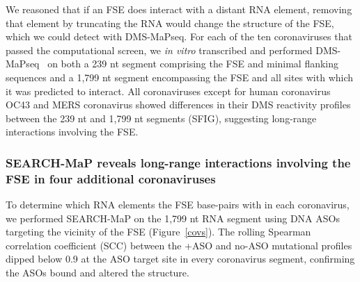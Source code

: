 \documentclass[main.tex]{subfiles}
\begin{document}
We reasoned that if an FSE does interact with a distant RNA element, removing that element by truncating the RNA would change the structure of the FSE, which we could detect with DMS-MaPseq.
For each of the ten coronaviruses that passed the computational screen, we \textit{in vitro} transcribed and performed DMS-MaPseq~\cite{Zubradt2016} on both a 239 nt segment comprising the FSE and minimal flanking sequences and a 1,799 nt segment encompassing the FSE and all sites with which it was predicted to interact.
All coronaviruses except for human coronavirus OC43 and MERS coronavirus showed differences in their DMS reactivity profiles between the 239 nt and 1,799 nt segments (SFIG), suggesting long-range interactions involving the FSE.

\subsubsection{SEARCH-MaP reveals long-range interactions involving the FSE in four additional coronaviruses}

To determine which RNA elements the FSE base-pairs with in each coronavirus, we performed SEARCH-MaP on the 1,799 nt RNA segment using DNA ASOs targeting the vicinity of the FSE (Figure~\ref{covs}).
The rolling Spearman correlation coefficient (SCC) between the +ASO and no-ASO mutational profiles dipped below 0.9 at the ASO target site in every coronavirus segment, confirming the ASOs bound and altered the structure.
\end{document}
